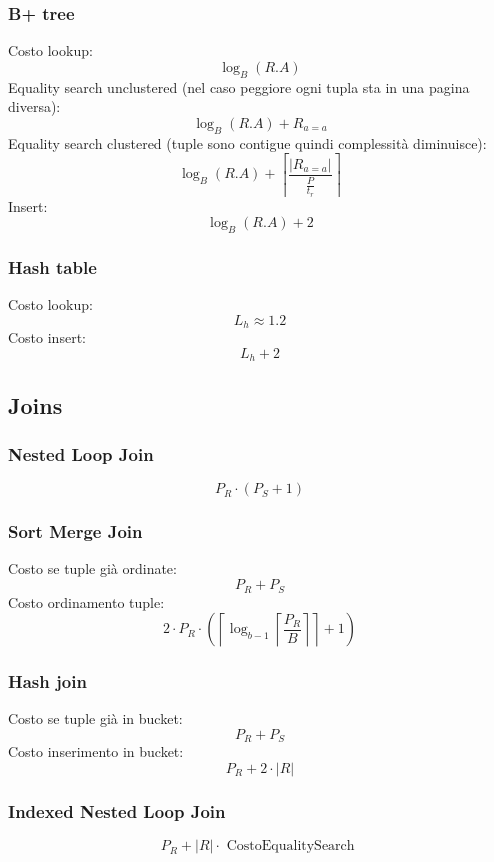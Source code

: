 \subsubsection*{B+ tree}
Costo lookup:
\[
	\log_B \left(R.A\right)
\]
Equality search unclustered (nel caso peggiore ogni tupla sta in una pagina diversa):
\[
	\log_B \left(R.A\right) + R_{a = a}
\]
Equality search clustered (tuple sono contigue quindi complessità diminuisce):
\[
	\log_B \left(R.A\right) +\left\lceil \frac{\left|R_{a = a}\right|}{ \frac{P}{t_r}} \right\rceil
\]
Insert:
\[
	\log_B \left(R.A\right)  + 2
\]
\subsubsection*{Hash table}
Costo lookup:
\[
	L_h \approx 1.2
\]
Costo insert:
\[
	L_h + 2
\]


\subsection{Joins}
\subsubsection*{Nested Loop Join}
\[
	P_R  \cdot  \left(P_S + 1\right)
\]
\subsubsection*{Sort Merge Join}
Costo se tuple già ordinate:
\[
	P_R + P_S
\]
Costo ordinamento tuple:
\[
	2 \cdot  P_R \cdot  \left(\left\lceil \log_{b-1} \left\lceil \frac{P_R}{B} \right\rceil \right\rceil + 1\right)
\]
\subsubsection*{Hash join}
Costo se tuple già in bucket:
\[
	P_R + P_S
\]
Costo inserimento in bucket:
\[
	P_R + 2 \cdot \left|R\right|
\]
\subsubsection*{Indexed Nested Loop Join}
\[
	P_R + \left|R\right| \cdot  \text{ CostoEqualitySearch }
\]


